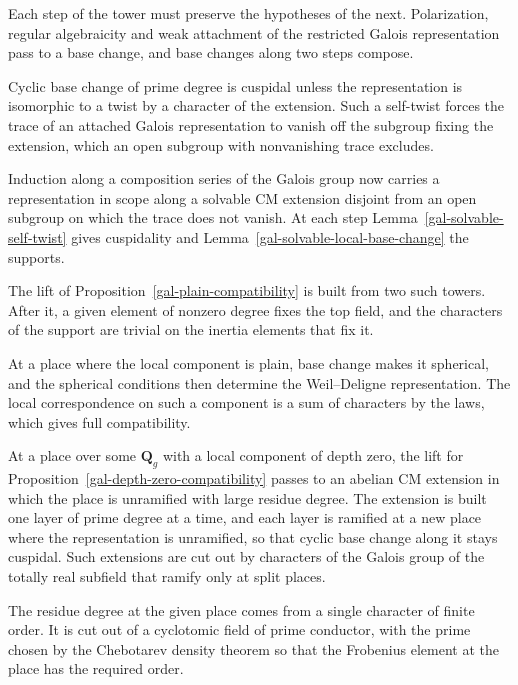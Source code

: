 Each step of the tower must preserve the hypotheses of the next. Polarization, regular algebraicity and
weak attachment of the restricted Galois representation pass to a base change, and base changes along
two steps compose.

Cyclic base change of prime degree is cuspidal unless the representation is isomorphic to a twist by a
character of the extension. Such a self-twist forces the trace of an attached Galois representation to
vanish off the subgroup fixing the extension, which an open subgroup with nonvanishing trace excludes.

Induction along a composition series of the Galois group now carries a representation in scope along a
solvable CM extension disjoint from an open subgroup on which the trace does not vanish. At each step
Lemma~\ref{gal-solvable-self-twist} gives cuspidality and Lemma~\ref{gal-solvable-local-base-change} the
supports.

The lift of Proposition~\ref{gal-plain-compatibility} is built from two such towers. After it, a given
element of nonzero degree fixes the top field, and the characters of the support are trivial on the
inertia elements that fix it.

At a place where the local component is plain, base change makes it spherical, and the spherical
conditions then determine the Weil--Deligne representation. The local correspondence on such a
component is a sum of characters by the laws, which gives full compatibility.

At a place over some $\mathbf Q_g$ with a local component of depth zero, the lift for
Proposition~\ref{gal-depth-zero-compatibility} passes to an abelian CM extension in which the place is
unramified with large residue degree. The extension is built one layer of prime degree at a time, and
each layer is ramified at a new place where the representation is unramified, so that cyclic base
change along it stays cuspidal. Such extensions are cut out by characters of the Galois group of the
totally real subfield that ramify only at split places.

The residue degree at the given place comes from a single character of finite order. It is cut out of
a cyclotomic field of prime conductor, with the prime chosen by the Chebotarev density theorem so that
the Frobenius element at the place has the required order.

